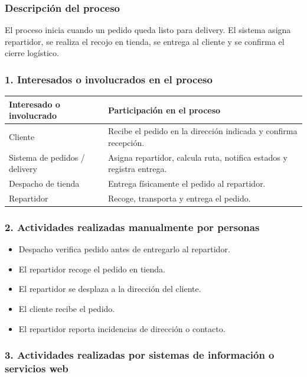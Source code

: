 \documentclass[a4paper,12pt]{article}
\begin{document}
\subsubsection*{Descripción del proceso}

El proceso inicia cuando un pedido queda listo para delivery. El sistema asigna repartidor, se realiza el recojo en tienda, se entrega al cliente y se confirma el cierre logístico.

\subsubsection*{1. Interesados o involucrados en el proceso}

\begin{longtable}{P{5cm} P{9cm}}
\toprule
\textbf{Interesado o involucrado} & \textbf{Participación en el proceso} \\
\midrule
Cliente & Recibe el pedido en la dirección indicada y confirma recepción. \\
Sistema de pedidos / delivery & Asigna repartidor, calcula ruta, notifica estados y registra entrega. \\
Despacho de tienda & Entrega físicamente el pedido al repartidor. \\
Repartidor & Recoge, transporta y entrega el pedido. \\
\bottomrule
\end{longtable}

\subsubsection*{2. Actividades realizadas manualmente por personas}

\begin{itemize}
    \item Despacho verifica pedido antes de entregarlo al repartidor.
    \item El repartidor recoge el pedido en tienda.
    \item El repartidor se desplaza a la dirección del cliente.
    \item El cliente recibe el pedido.
    \item El repartidor reporta incidencias de dirección o contacto.
\end{itemize}

\subsubsection*{3. Actividades realizadas por sistemas de información o servicios web}
\end{document}
